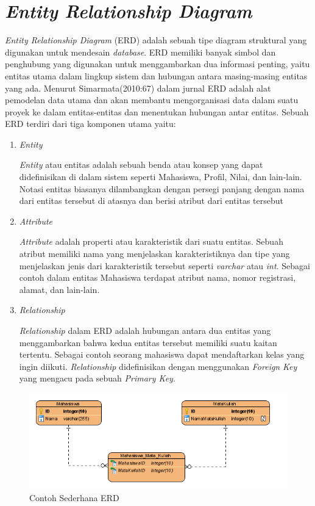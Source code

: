 \section{\textit{Entity Relationship Diagram}}

	\emph{Entity Relationship Diagram} (ERD) adalah sebuah tipe diagram struktural yang digunakan untuk mendesain \textit{database}. ERD memiliki banyak simbol dan penghubung yang digunakan untuk menggambarkan dua informasi penting, yaitu entitas utama dalam lingkup sistem dan hubungan antara masing-masing entitas yang ada. Menurut Simarmata(2010:67) dalam jurnal \cite{Fridayanthie2016} ERD adalah alat pemodelan data utama dan akan membantu mengorganisasi data dalam suatu proyek ke dalam entitas-entitas dan menentukan hubungan antar entitas. Sebuah ERD terdiri dari tiga komponen utama yaitu:

\begin{enumerate}

	\item \textit{Entity}

	\textit{Entity} atau entitas adalah sebuah benda atau konsep yang dapat didefinisikan di dalam sistem seperti Mahasiswa, Profil, Nilai, dan lain-lain. Notasi entitas biasanya dilambangkan dengan persegi panjang dengan nama dari entitas tersebut di atasnya dan berisi atribut dari entitas tersebut 

	\item \textit{Attribute}

	\textit{Attribute} adalah properti atau karakteristik dari suatu entitas. Sebuah atribut memiliki nama yang menjelaskan karakteristiknya dan tipe yang menjelaskan jenis dari karakteristik tersebut seperti \textit{varchar} atau \textit{int}. Sebagai contoh dalam entitas Mahasiswa terdapat atribut nama, nomor registrasi, alamat, dan lain-lain.

	\item \textit{Relationship}

	\textit{Relationship} dalam ERD adalah hubungan antara dua entitas yang menggambarkan bahwa kedua entitas tersebut memiliki suatu kaitan tertentu. Sebagai contoh seorang mahasiswa dapat mendaftarkan kelas yang ingin diikuti. \textit{Relationship} didefinisikan dengan menggunakan \textit{Foreign} \textit{Key} yang mengacu pada sebuah \textit{Primary Key}.
\end{enumerate}


\begin{figure}[H]
	\centering
	\includegraphics[width=1\textwidth]{gambar/contoh_erd}
	\caption{Contoh Sederhana ERD}
\end{figure}

